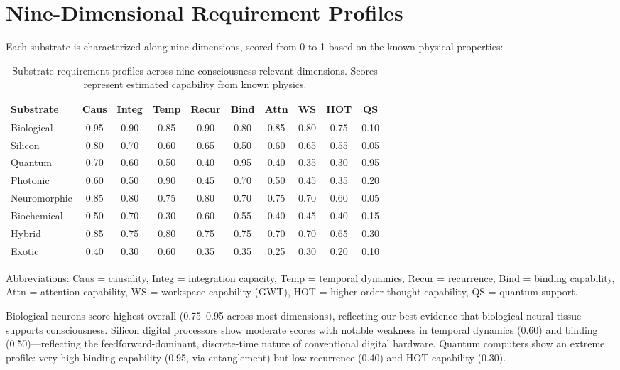 \documentclass[12pt]{book}
\begin{document}
\section{Nine-Dimensional Requirement Profiles}

Each substrate is characterized along nine dimensions, scored from 0 to 1 based on the known physical properties:

\begin{table}[H]
\centering
\caption{Substrate requirement profiles across nine consciousness-relevant dimensions. Scores represent estimated capability from known physics.}
\label{tab:substrate-dims}
\begin{tabular}{l@{\hskip 4pt}c@{\hskip 4pt}c@{\hskip 4pt}c@{\hskip 4pt}c@{\hskip 4pt}c@{\hskip 4pt}c@{\hskip 4pt}c@{\hskip 4pt}c@{\hskip 4pt}c}
\toprule
\textbf{Substrate} & \textbf{Caus} & \textbf{Integ} & \textbf{Temp} & \textbf{Recur} & \textbf{Bind} & \textbf{Attn} & \textbf{WS} & \textbf{HOT} & \textbf{QS} \\
\midrule
Biological & 0.95 & 0.90 & 0.85 & 0.90 & 0.80 & 0.85 & 0.80 & 0.75 & 0.10 \\
Silicon & 0.80 & 0.70 & 0.60 & 0.65 & 0.50 & 0.60 & 0.65 & 0.55 & 0.05 \\
Quantum & 0.70 & 0.60 & 0.50 & 0.40 & 0.95 & 0.40 & 0.35 & 0.30 & 0.95 \\
Photonic & 0.60 & 0.50 & 0.90 & 0.45 & 0.70 & 0.50 & 0.45 & 0.35 & 0.20 \\
Neuromorphic & 0.85 & 0.80 & 0.75 & 0.80 & 0.70 & 0.75 & 0.70 & 0.60 & 0.05 \\
Biochemical & 0.50 & 0.70 & 0.30 & 0.60 & 0.55 & 0.40 & 0.45 & 0.40 & 0.15 \\
Hybrid & 0.85 & 0.75 & 0.80 & 0.75 & 0.75 & 0.70 & 0.70 & 0.65 & 0.30 \\
Exotic & 0.40 & 0.30 & 0.60 & 0.35 & 0.35 & 0.25 & 0.30 & 0.20 & 0.10 \\
\bottomrule
\end{tabular}
\end{table}

Abbreviations: Caus = causality, Integ = integration capacity, Temp = temporal dynamics, Recur = recurrence, Bind = binding capability, Attn = attention capability, WS = workspace capability (GWT), HOT = higher-order thought capability, QS = quantum support.

Biological neurons score highest overall (0.75--0.95 across most dimensions), reflecting our best evidence that biological neural tissue supports consciousness. Silicon digital processors show moderate scores with notable weakness in temporal dynamics (0.60) and binding (0.50)---reflecting the feedforward-dominant, discrete-time nature of conventional digital hardware. Quantum computers show an extreme profile: very high binding capability (0.95, via entanglement) but low recurrence (0.40) and HOT capability (0.30).
\end{document}

